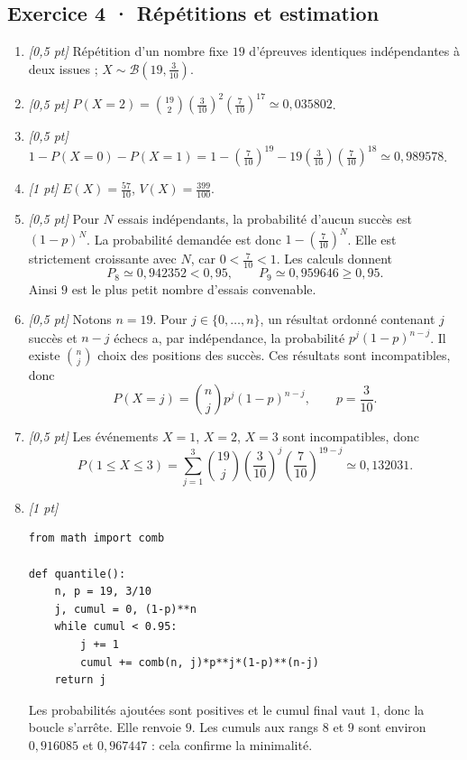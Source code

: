 \subsection*{Exercice 4 · Répétitions et estimation}\begin{enumerate}

\item \textit{[0,5 pt]} Répétition d'un nombre fixe $19$ d'épreuves identiques indépendantes à deux issues ; $X\sim\mathcal B(19,\frac{3}{10})$.

\item \textit{[0,5 pt]} $P(X=2)=\binom{19}2(\frac{3}{10})^2(\frac{7}{10})^{17}\simeq0{,}035802$.

\item \textit{[0,5 pt]} $1-P(X=0)-P(X=1)=1-(\frac{7}{10})^{19}-19(\frac{3}{10})(\frac{7}{10})^{18}\simeq0{,}989578$.

\item \textit{[1 pt]} $E(X)=\frac{57}{10}$, $V(X)=\frac{399}{100}$.

\item \textit{[0,5 pt]} Pour $N$ essais indépendants, la probabilité d'aucun succès est $(1-p)^N$. La probabilité demandée est donc $1-(\frac{7}{10})^N$. Elle est strictement croissante avec $N$, car $0<\frac{7}{10}<1$. Les calculs donnent
\[P_{8}\simeq0{,}942352<0{,}95,\qquad P_{9}\simeq0{,}959646\ge0{,}95.\]
Ainsi $9$ est le plus petit nombre d'essais convenable.

\item \textit{[0,5 pt]} Notons $n=19$. Pour $j\in\{0,\ldots,n\}$, un résultat ordonné contenant $j$ succès et $n-j$ échecs a, par indépendance, la probabilité $p^j(1-p)^{n-j}$. Il existe $\binom nj$ choix des positions des succès. Ces résultats sont incompatibles, donc
\[P(X=j)=\binom nj p^j(1-p)^{n-j},\qquad p=\frac{3}{10}.\]

\item \textit{[0,5 pt]} Les événements $X=1$, $X=2$, $X=3$ sont incompatibles, donc
\[P(1\le X\le3)=\sum_{j=1}^3\binom{19}j(\frac{3}{10})^j(\frac{7}{10})^{19-j}\simeq0{,}132031.\]


\item \textit{[1 pt]} 
\begin{lstlisting}
from math import comb

def quantile():
    n, p = 19, 3/10
    j, cumul = 0, (1-p)**n
    while cumul < 0.95:
        j += 1
        cumul += comb(n, j)*p**j*(1-p)**(n-j)
    return j
\end{lstlisting}
Les probabilités ajoutées sont positives et le cumul final vaut $1$, donc la boucle s'arrête. Elle renvoie $9$. Les cumuls aux rangs $8$ et $9$ sont environ $0{,}916085$ et $0{,}967447$ : cela confirme la minimalité.

\end{enumerate}

